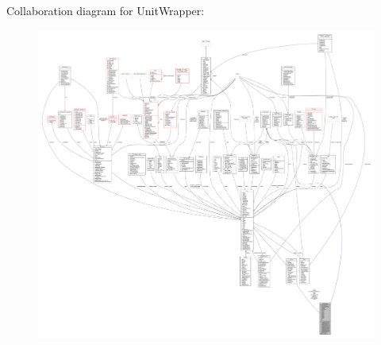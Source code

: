 Collaboration diagram for Unit\+Wrapper\+:
\nopagebreak
\begin{figure}[H]
\begin{center}
\leavevmode
\includegraphics[width=350pt]{df/d5d/classUnitWrapper__coll__graph}
\end{center}
\end{figure}
